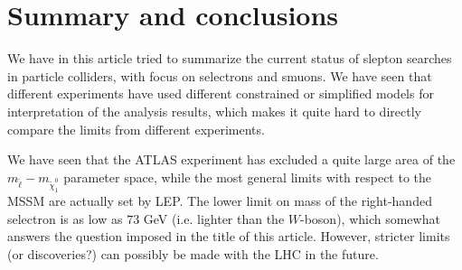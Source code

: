 \documentclass[twocolumn,a4paper,10pt]{article}
\begin{document}
\section{Summary and conclusions}

We have in this article tried to summarize the current status of slepton searches in particle 
colliders, with focus on selectrons and smuons. We have seen that different experiments have used 
different constrained or simplified models for interpretation of the analysis results, which makes it 
quite hard to directly compare the limits from different experiments.   

We have seen that the ATLAS experiment has excluded a quite large area of the 
$m_{\tilde{\ell}}-m_{\tilde{\chi}_1^0}$ parameter space, while the most general limits with respect 
to the MSSM are actually set by LEP. The lower limit on mass of the right-handed selectron is as 
low as $73$ GeV (i.e. lighter than the $W$-boson), which somewhat answers the question imposed in 
the title of this article. However, stricter limits (or discoveries?) can possibly be made with the
LHC in the future.   

\end{document}
